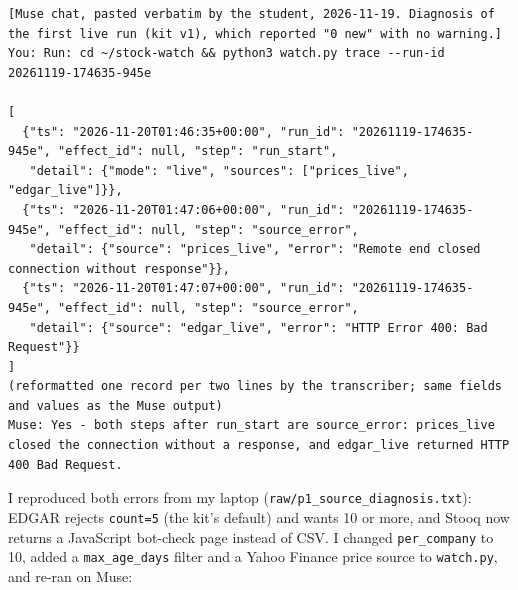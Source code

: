 \documentclass[11pt]{article}
\begin{document}
\begingroup\lstset{basicstyle=\ttfamily\tiny}
\begin{lstlisting}
[Muse chat, pasted verbatim by the student, 2026-11-19. Diagnosis of the first live run (kit v1), which reported "0 new" with no warning.]
You: Run: cd ~/stock-watch && python3 watch.py trace --run-id 20261119-174635-945e

[
  {"ts": "2026-11-20T01:46:35+00:00", "run_id": "20261119-174635-945e", "effect_id": null, "step": "run_start",
   "detail": {"mode": "live", "sources": ["prices_live", "edgar_live"]}},
  {"ts": "2026-11-20T01:47:06+00:00", "run_id": "20261119-174635-945e", "effect_id": null, "step": "source_error",
   "detail": {"source": "prices_live", "error": "Remote end closed connection without response"}},
  {"ts": "2026-11-20T01:47:07+00:00", "run_id": "20261119-174635-945e", "effect_id": null, "step": "source_error",
   "detail": {"source": "edgar_live", "error": "HTTP Error 400: Bad Request"}}
]
(reformatted one record per two lines by the transcriber; same fields and values as the Muse output)
Muse: Yes - both steps after run_start are source_error: prices_live closed the connection without a response, and edgar_live returned HTTP 400 Bad Request.
\end{lstlisting}
\endgroup
I reproduced both errors from my laptop (\texttt{raw/\allowbreak{}p1\_\allowbreak{}source\_\allowbreak{}diagnosis.txt}): EDGAR rejects \texttt{count=5} (the kit's default) and wants 10 or more, and Stooq now returns a JavaScript bot-check page instead of CSV. I changed \texttt{per\_\allowbreak{}company} to 10, added a \texttt{max\_\allowbreak{}age\_\allowbreak{}days} filter and a Yahoo Finance price source to \texttt{watch.py}, and re-ran on Muse:
\end{document}
